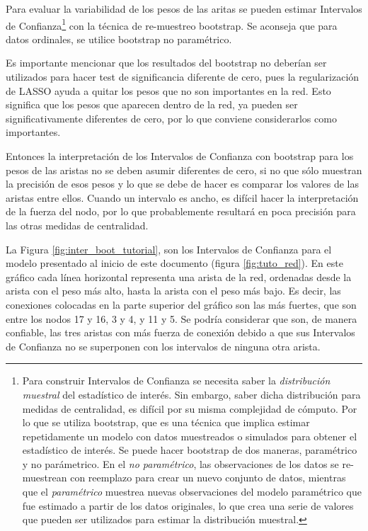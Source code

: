 \documentclass[11pt,spanish]{article}\usepackage[]{graphicx}\usepackage[]{color}
\begin{document}
Para evaluar la variabilidad de los pesos de las aritas se pueden estimar Intervalos de Confianza\footnote{Para construir Intervalos de Confianza se necesita saber la \emph{distribución muestral} del estadístico de interés. Sin embargo, saber dicha distribución para medidas de centralidad, es difícil por su misma complejidad de cómputo. Por lo que se utiliza bootstrap, que es una técnica que implica estimar repetidamente un modelo con datos muestreados o simulados para obtener el estadístico de interés. Se puede hacer bootstrap de dos maneras, paramétrico y no parámetrico. En el \emph{no paramétrico}, las observaciones de los datos se re-muestrean con reemplazo para crear un nuevo conjunto de datos, mientras que el \emph{paramétrico} muestrea nuevas observaciones del modelo paramétrico que fue estimado a partir de los datos originales, lo que crea una serie de valores que pueden ser utilizados para estimar la distribución muestral.} con la técnica de re-muestreo bootstrap. Se aconseja que para datos ordinales, se utilice bootstrap no paramétrico. 

Es importante mencionar que los resultados del bootstrap no deberían ser utilizados para hacer test de significancia diferente de cero, pues la regularización de LASSO ayuda a quitar los pesos que no son importantes en la red. Esto significa que los pesos que aparecen dentro de la red, ya pueden ser significativamente diferentes de cero, por lo que conviene considerarlos como importantes. 

Entonces la interpretación de los Intervalos de Confianza con bootstrap para los pesos de las aristas no se deben asumir diferentes de cero, si no que sólo muestran la precisión de esos pesos y lo que se debe de hacer es comparar los valores de las aristas entre ellos. Cuando un intervalo es ancho, es difícil hacer la interpretación de la fuerza del nodo, por lo que probablemente resultará en poca precisión para las otras medidas de centralidad. 

La Figura \ref{fig:inter_boot_tutorial}, son los Intervalos de Confianza para el modelo presentado al inicio de este documento (figura \ref{fig:tuto_red}). En este gráfico cada línea horizontal representa una arista de la red, ordenadas desde la arista con el peso más alto, hasta la arista con el peso más bajo. Es decir, las conexiones colocadas en la parte superior del gráfico son las más fuertes, que son entre los nodos 17 y 16, 3 y 4, y 11 y 5. Se podría considerar que son, de manera confiable, las tres aristas con más fuerza de conexión debido a que sus Intervalos de Confianza no se superponen con los intervalos de ninguna otra arista.
\end{document}
